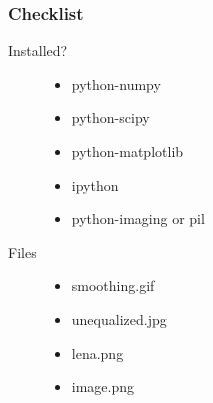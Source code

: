 \documentclass[presentation]{beamer}
\begin{document}
\begin{frame}
\frametitle{Checklist}
\label{sec-1_3}


\begin{description}
\item[Installed?]

\begin{itemize}
\item python-numpy
\item python-scipy
\item python-matplotlib
\item ipython
\item python-imaging or pil
\end{itemize}

\item[Files]

\begin{itemize}
\item smoothing.gif
\item unequalized.jpg
\item lena.png
\item image.png
\end{itemize}

\end{description}
\end{frame}
\end{document}
